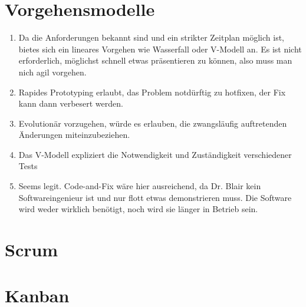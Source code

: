 \documentclass{scrartcl}
\begin{document}
\section{Vorgehensmodelle}
\begin{enumerate}
   \item Da die Anforderungen bekannt sind und ein strikter Zeitplan möglich
      ist, bietes sich ein lineares Vorgehen wie Wasserfall oder V-Modell an.
      Es ist nicht erforderlich, möglichst schnell etwas präsentieren zu können,
      also muss man nich agil vorgehen.
   \item Rapides Prototyping erlaubt, das Problem notdürftig zu hotfixen, der
      Fix kann dann verbesert werden.
   \item Evolutionär vorzugehen, würde es erlauben, die zwangsläufig
      auftretenden Änderungen miteinzubeziehen.
   \item Das V-Modell expliziert die Notwendigkeit und Zuständigkeit
      verschiedener Tests
   \item Seems legit. Code-and-Fix wäre hier ausreichend, da Dr. Blair kein
      Softwareingenieur ist und nur flott etwas demonstrieren muss. Die Software
      wird weder wirklich benötigt, noch wird sie länger in Betrieb sein.
\end{enumerate}

\section{Scrum}

\section{Kanban}
\end{document}
